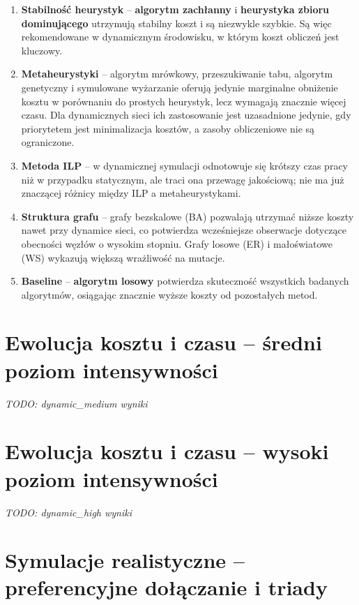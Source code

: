 \begin{enumerate}
  \item \textbf{Stabilność heurystyk} -- \textbf{algorytm zachłanny} i \textbf{heurystyka zbioru dominującego} utrzymują stabilny koszt i są niezwykle szybkie. Są więc rekomendowane w dynamicznym środowisku, w którym koszt obliczeń jest kluczowy.

  \item \textbf{Metaheurystyki} -- algorytm mrówkowy, przeszukiwanie tabu, algorytm genetyczny i symulowane wyżarzanie oferują jedynie marginalne obniżenie kosztu w porównaniu do prostych heurystyk, lecz wymagają znacznie więcej czasu. Dla dynamicznych sieci ich zastosowanie jest uzasadnione jedynie, gdy priorytetem jest minimalizacja kosztów, a zasoby obliczeniowe nie są ograniczone.

  \item \textbf{Metoda ILP} -- w dynamicznej symulacji odnotowuje się krótszy czas pracy niż w przypadku statycznym, ale traci ona przewagę jakościową; nie ma już znaczącej różnicy między ILP a metaheurystykami.

  \item \textbf{Struktura grafu} -- grafy bezskalowe (BA) pozwalają utrzymać niższe koszty nawet przy dynamice sieci, co potwierdza wcześniejsze obserwacje dotyczące obecności węzłów o wysokim stopniu. Grafy losowe (ER) i małoświatowe (WS) wykazują większą wrażliwość na mutacje.

  \item \textbf{Baseline} -- \textbf{algorytm losowy} potwierdza skuteczność wszystkich badanych algorytmów, osiągając znacznie wyższe koszty od pozostałych metod.
\end{enumerate}

\section{Ewolucja kosztu i czasu -- średni poziom intensywności}

\emph{TODO: dynamic\_medium wyniki}

\section{Ewolucja kosztu i czasu -- wysoki poziom intensywności}

\emph{TODO: dynamic\_high wyniki}

\section{Symulacje realistyczne -- preferencyjne dołączanie i triady}

